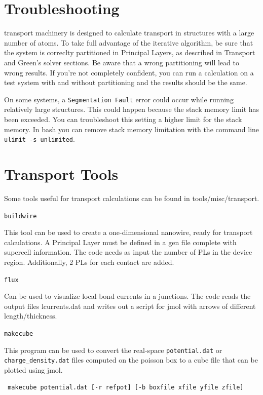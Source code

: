 \section{Troubleshooting}

\dftbp{} transport machinery is designed to calculate transport in structures
with a large number of atoms. To take full advantage of the iterative algorithm,
be sure that the system is correclty partitioned in Principal Layers, as
described in Transport and Green's solver sections. Be aware that a wrong
partitioning will lead to wrong results. If you're not completely confident, you
can run a calculation on a test system with and without partitioning and the
results should be the same.


On some systems, a \verb|Segmentation Fault| error could occur while running
relatively large structures. This could happen because the stack memory limit
has been exceeded. You can troubleshoot this setting a higher limit for the
stack memory. In bash you can remove stack memory limitation with the command
line \verb|ulimit -s unlimited|.

\section{Transport Tools}

Some tools useful for transport calculations can be found in tools/misc/transport.

\verb|buildwire|

This tool can be used to create a one-dimensional nanowire, ready for transport 
calculations. A Principal Layer must be defined in a gen file complete with 
supercell information. 
The code needs as input the number of PLs in the device region. Additionally,
2 PLs for each contact are added.


\verb|flux|

Can be used to visualize local bond currents in a junctions. The code reads the
output files lcurrents.dat and writes out a script for jmol with arrows of
different length/thickness. 


\verb|makecube|

This program can be used to convert the real-space \verb|potential.dat| or
\verb|charge_density.dat| files computed on the poisson box to a cube file that
can be plotted using jmol.

\begin{verbatim}
 makecube potential.dat [-r refpot] [-b boxfile xfile yfile zfile]
\end{verbatim}


